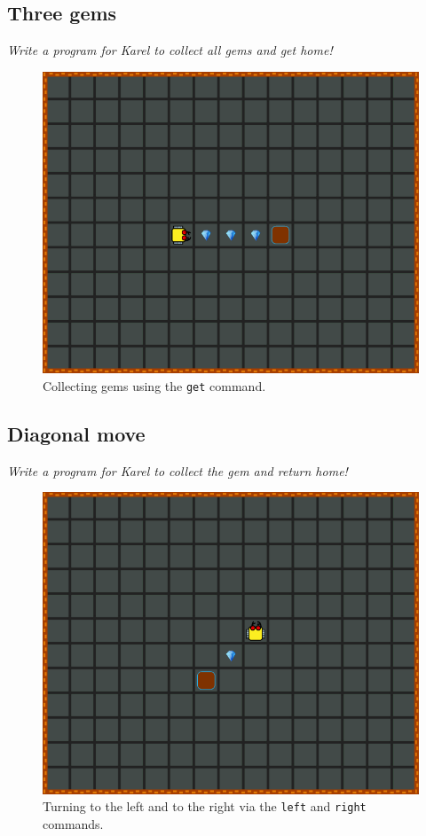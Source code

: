 \subsection{Three gems}

{\em Write a program for Karel to collect all gems and get home! 

\begin{figure}[!ht]
\begin{center}
\includegraphics[height=0.4\textwidth]{img/b02.png}
\end{center}
\vspace{-4mm}
\caption{Collecting gems using the {\tt get} command.}
\label{fig:b02}
\vspace{-1cm}
\end{figure}
\newpage


\subsection{Diagonal move}

{\em Write a program for Karel to collect the gem and return home! 

\begin{figure}[!ht]
\begin{center}
\includegraphics[height=0.4\textwidth]{img/b03.png}
\end{center}
\vspace{-4mm}
\caption{Turning to the left and to the right via the {\tt left} and {\tt right} commands.}
\label{fig:b03}
\vspace{-1cm}
\end{figure}



}}
